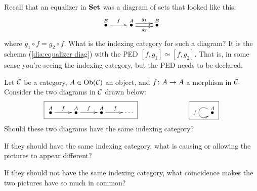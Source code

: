 \documentclass[../main/CT4S-EN-RU]{subfiles}
\begin{document}
\begin{exerciseRUS}
\end{exerciseRUS}

\begin{exampleENG}
Recall that an equalizer in ${\mathbf{Set}}$ was a diagram of sets that looked like this:
\begin{align}\label{dia:equalizer diag}
\xymatrix{\LMO{E}\ar[r]^f&\LMO{A}\ar@<.5ex>[r]^{g_1}\ar@<-.5ex>[r]_{g_2}&\LMO{B}}
\end{align}
where $g_1\circ f=g_2\circ f.$ What is the indexing category for such a diagram? It is the schema (\ref{dia:equalizer diag}) with the PED $[f,g_1]\simeq[f,g_2].$ That is, in some sense you're seeing the indexing category, but the PED needs to be declared.
\end{exampleENG}

\begin{exampleRUS}
\end{exampleRUS}

\begin{exerciseENG}\label{exc:coincidence}
Let $\mathcal{C}$ be a category, $A\in\operatorname{Ob}(\mathcal{C})$ an object, and $f\colon A\rightarrow A$ a morphism in $\mathcal{C}.$ Consider the two diagrams in $\mathcal{C}$ drawn below:
$$\fbox{\xymatrix{\LMO{A}\ar[r]^f&\LMO{A}\ar[r]^f&\LMO{A}\ar[r]^f&\cdots}}\hspace{1in}\fbox{\xymatrix{\LMO{A}\ar@(ul,dl)[]_f}}$$
\sexc Should these two diagrams have the same indexing category?
\item If they should have the same indexing category, what is causing or allowing the pictures to appear different?
\item If they should not have the same indexing category, what coincidence makes the two pictures have so much in common?
\endsexc
\end{exerciseENG}

\begin{exerciseRUS}\label{exc:coincidence}
\end{exerciseRUS}
\end{document}
